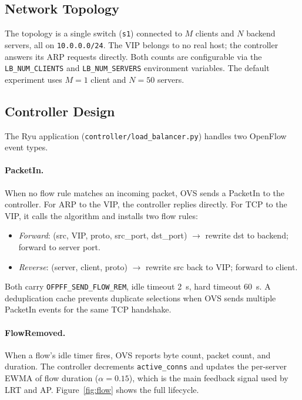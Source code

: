 \documentclass[10pt,a4paper,twocolumn]{article}
\numberwithin{figure}{section}
\numberwithin{table}{section}
\numberwithin{equation}{section}
\begin{document}
\subsection{Network Topology}

The topology is a single switch (\texttt{s1}) connected to $M$ clients and
$N$ backend servers, all on \texttt{10.0.0.0/24}. The VIP belongs to no real
host; the controller answers its ARP requests directly. Both counts are
configurable via the \texttt{LB\_NUM\_CLIENTS} and \texttt{LB\_NUM\_SERVERS}
environment variables. The default experiment uses $M = 1$ client and
$N = 50$ servers.

\subsection{Controller Design}

The Ryu application (\texttt{controller/load\_balancer.py}) handles two OpenFlow
event types.

\paragraph{PacketIn.}
When no flow rule matches an incoming packet, OVS sends a PacketIn to the
controller. For ARP to the VIP, the controller replies directly. For TCP to the
VIP, it calls the algorithm and installs two flow rules:

\begin{itemize}
\item \textit{Forward}: (src, VIP, proto, src\_port, dst\_port)
  $\to$ rewrite dst to backend; forward to server port.
\item \textit{Reverse}: (server, client, proto)
  $\to$ rewrite src back to VIP; forward to client.
\end{itemize}

Both carry \texttt{OFPFF\_SEND\_FLOW\_REM}, idle timeout \SI{2}{s},
hard timeout \SI{60}{s}. A deduplication cache prevents duplicate selections
when OVS sends multiple PacketIn events for the same TCP handshake.

\paragraph{FlowRemoved.}
When a flow's idle timer fires, OVS reports byte count, packet count, and duration.
The controller decrements \texttt{active\_conns} and updates the per-server EWMA
of flow duration ($\alpha = 0.15$), which is the main feedback signal used by LRT
and AP. Figure~\ref{fig:flow} shows the full lifecycle.
\end{document}
